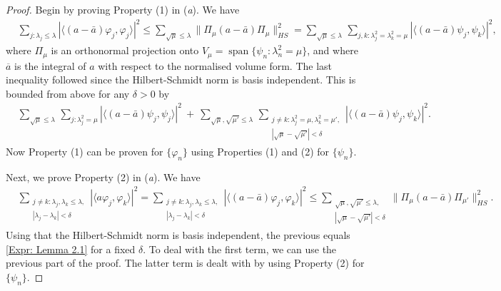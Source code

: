 \documentclass[10pt,a4paper]{amsart}
\renewcommand{\phi}{\varphi}
\newcommand{\1}{\mathrm{\mathbf{1}}}
\numberwithin{equation}{section}
\begin{document}
\begin{proof}

    Begin by proving Property (1) in (\emph{a}). We have
    \begin{align*}
        &
        \sum_{ j : \lambda_j \leq \lambda } | \langle (a - \bar{a}) \phi_j, \phi_j \rangle |^2 \leq \sum_{ \sqrt{\mu} \leq \lambda } \| \Pi_\mu (a - \bar{a}) \Pi_\mu \|_{HS}^2 = \sum_{ \sqrt{\mu} \leq \lambda } \, \sum_{ j,k: \lambda_j^2 = \lambda_k^2 = \mu } | \langle (a - \bar{a}) \psi_j, \psi_k \rangle |^2,
    \end{align*}
    where $\Pi_\mu$ is an orthonormal projection onto $V_\mu = \operatorname{span} \{  \psi_n : \lambda_n^2 = \mu \}$, and where $\overline{a}$ is the integral of $a$ with respect to the normalised volume form. The last inequality followed since the Hilbert-Schmidt norm is basis independent. This is bounded from above for any $\delta > 0$ by
    \begin{align}
        &
        \label{Expr: Lemma 2.1}
        \sum_{\sqrt{\mu} \leq \lambda } \, \sum_{j : \lambda_j^2 = \mu} | \langle (a - \bar{a}) \psi_j, \psi_j \rangle |^2 \ + \  \sum_{ \sqrt{\mu}, \sqrt{\mu'} \leq \lambda } \, \sum_{ \substack{  j \neq k: \lambda_j^2 = \mu, \lambda_k^2 = \mu', \\ | \sqrt{\mu} - \sqrt{\mu'}| < \delta} } | \langle (a - \bar{a}) \psi_j, \psi_k \rangle |^2.
    \end{align}
    Now Property (1) can be proven for $\{ \phi_n \}$ using Properties (1) and (2) for $\{ \psi_n\}$.

    Next, we prove Property (2) in (\emph{a}). We have
    \begin{align*}
        &
        \sum_{ \substack{ j \neq k : \lambda_j , \lambda_k \leq \lambda, \\ | \lambda_j - \lambda_k | < \delta} } | \langle a \phi_j, \phi_k  \rangle |^2 = \sum_{ \substack{ j \neq k : \lambda_j , \lambda_k \leq \lambda, \\ | \lambda_j - \lambda_k | < \delta} } | \langle (a - \bar{a}) \phi_j, \phi_k  \rangle |^2 \leq  \sum_{ \substack{\sqrt{\mu}, \sqrt{\mu'} \leq \lambda, \\ | \sqrt{\mu}  - \sqrt{\mu'} | < \delta } }  \| \Pi_\mu (a - \bar{a}) \Pi_{\mu'} \|_{HS}^2.
    \end{align*}
    Using that the Hilbert-Schmidt norm is basis independent, the previous equals \eqref{Expr: Lemma 2.1} for a fixed $\delta$. To deal with the first term, we can use the previous part of the proof. The latter term is dealt with by using Property (2) for $\{  \psi_n\}$.


\end{proof}
\end{document}
